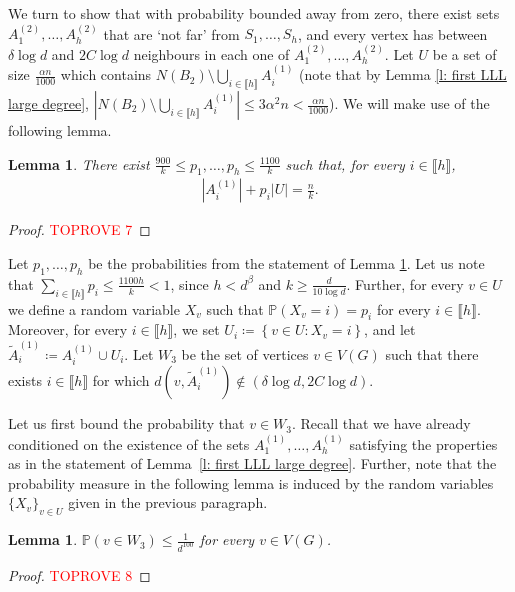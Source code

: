 \documentclass[notitlepage]{scrartcl}
\newcommand{\br}[1]{\llbracket{#1}\rrbracket}
\newtheorem{lemma}[thm]{Lemma}
\begin{document}
We turn to show that with probability bounded away from zero, there exist sets $A_1^{(2)},\ldots,A_h^{(2)}$ that are `not far' from $S_1,\ldots, S_h$, and every vertex has between $\delta\log d$ and $2C\log d$ neighbours in each one of $A_1^{(2)},\ldots, A_h^{(2)}$. Let $U$ be a set of size $\frac{\alpha n}{1000}$ which contains $N(B_2)\setminus \bigcup_{i\in \br{h}}A_i^{(1)}$ (note that by Lemma \ref{l: first LLL large degree}, $\left|N(B_2)\setminus \bigcup_{i\in \br{h}}A_i^{(1)}\right|\le 3\alpha^2n<\frac{\alpha n}{1000}$). We will make use of the following lemma.
\begin{lemma}\label{l: sprinkling probability}
There exist $\frac{900}{k}\le p_1,\ldots, p_h\le \frac{1100}{k}$ such that, for every $i\in \br{h}$, 
\begin{align*}
    |A_i^{(1)}|+p_i|U|=\frac{n}{k}.
\end{align*}
\end{lemma}
\begin{proof}\textcolor{red}{TOPROVE 7}\end{proof}

Let $p_1,\ldots, p_h$ be the probabilities from the statement of Lemma \ref{l: sprinkling probability}. Let us note that $\sum_{i\in \br{h}}p_i\le \frac{1100h}{k}<1$, since $h< d^\beta$ and $k\ge \frac{d}{10\log d}$. Further, for every $v\in U$ we define a random variable $X_v$ such that $\mathbb{P}\left(X_v=i\right)=p_i$ for every $i\in \br{h}$. Moreover, for every $i\in \br{h}$, we set $U_i\coloneqq\left\{v\in U\colon X_v=i\right\}$, and let $\tilde{A}_i^{(1)}\coloneqq A_i^{(1)}\cup U_i$. Let $W_3$ be the set of vertices $v\in V(G)$ such that there exists $i\in \br{h}$ for which $d(v,\tilde{A}_i^{(1)})\notin (\delta\log d, 2C\log d)$. 

Let us first bound the probability that $v\in W_3$. Recall that we have already conditioned on the existence of the sets $A_1^{(1)}, \ldots, A_h^{(1)}$ satisfying the properties as in the statement of Lemma~\ref{l: first LLL large degree}. Further, note that the probability measure in the following lemma is induced by the random variables $\{X_v\}_{v \in U}$ given in the previous paragraph.
\begin{lemma}\label{l: W_2 probability}
$\mathbb{P}\left(v\in W_3\right)\le \frac{1}{d^{100}}$ for every $v\in V(G)$.
\end{lemma}
\begin{proof}\textcolor{red}{TOPROVE 8}\end{proof}
\end{document}
